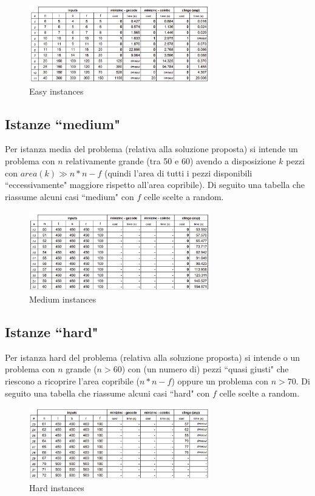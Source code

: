 \documentclass{article}
\begin{document}
\begin{figure}[ht!]
    \centering
    \includegraphics[width=0.7\textwidth]{images/easy-instances.png}
    \caption{Easy instances}
\end{figure}

\subsection{Istanze ``medium"}
Per istanza media del problema (relativa alla soluzione proposta) si intende un problema con $n$ relativamente grande (tra 50 e 60)  avendo a disposizione $k$ pezzi con $area(k) \gg n*n-f$ (quindi l'area di tutti i pezzi disponibili ``eccessivamente" maggiore rispetto all'area copribile). Di seguito una tabella che riassume alcuni casi ``medium" con $f$ celle scelte a random.\\

\begin{figure}[ht!]
    \centering
    \includegraphics[width=0.7\textwidth]{images/medium-instances.png}
    \caption{Medium instances}
\end{figure}

\subsection{Istanze ``hard"}
Per istanza hard del problema (relativa alla soluzione proposta) si intende o un problema con $n$ grande ($n > 60$) con (un numero di) pezzi ``quasi giusti" che riescono a ricoprire l'area copribile ($n*n - f$) oppure un problema con $n > 70$. Di seguito una tabella che riassume alcuni casi ``hard" con $f$ celle scelte a random.\\

\begin{figure}[ht!]
    \centering
    \includegraphics[width=0.7\textwidth]{images/hard-instances.png}
    \caption{Hard instances}
\end{figure}
\end{document}
